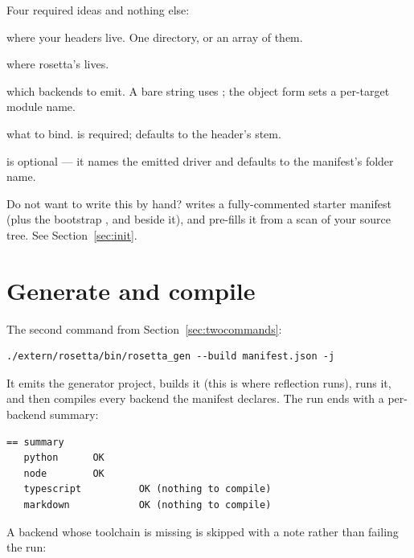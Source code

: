 Four required ideas and nothing else:

\begin{description}[leftmargin=0cm,style=nextline,font=\normalfont\code]
  \item[user\_include] where your headers live. One directory, or an array of
    them.
  \item[rosetta\_include] where rosetta's  lives.
  \item[targets] which backends to emit. A bare string uses
    ; the object form sets a per-target module name.
  \item[classes] what to bind.  is required; 
    defaults to the header's stem.
\end{description}

 is optional --- it names the emitted driver and
defaults to the manifest's folder name.

\begin{note}
Do not want to write this by hand?  writes a
fully-commented starter manifest (plus the bootstrap ,
 and  beside it), and  pre-fills it from a scan of your source tree.
See Section~\ref{sec:init}.
\end{note}

\section{Generate and compile}

The second command from Section~\ref{sec:twocommands}:

\begin{lstlisting}[style=sh]
./extern/rosetta/bin/rosetta_gen --build manifest.json -j
\end{lstlisting}

It emits the generator project, builds it (this is where reflection runs), runs
it, and then compiles every backend the manifest declares. The run ends with a
per-backend summary:

\begin{lstlisting}[style=plain]
== summary
   python      OK
   node        OK
   typescript          OK (nothing to compile)
   markdown            OK (nothing to compile)
\end{lstlisting}

A backend whose toolchain is missing is skipped with a note rather than failing
the run:

